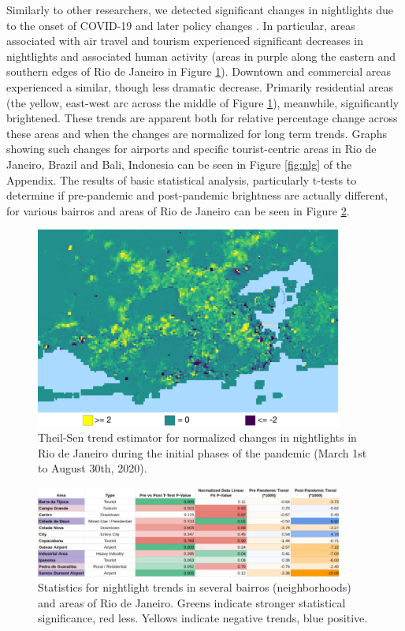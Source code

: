 Similarly to other researchers, we detected significant changes in nightlights due to the onset of COVID-19 and later policy changes \cite{elvidgeDimmingLightsChina2020, xbsdScipy2021Predicting2021}. In particular, areas associated with air travel and tourism experienced significant decreases in nightlights and associated human activity (areas in purple along the eastern and southern edges of Rio de Janeiro in Figure \ref{fig:nlts}). Downtown and commercial areas experienced a similar, though less dramatic decrease. Primarily residential areas (the yellow, east-west arc across the middle of Figure \ref{fig:nlts}), meanwhile, significantly brightened. These trends are apparent both for relative percentage change across these areas and when the changes are normalized for long term trends. Graphs showing such changes for airports and specific tourist-centric areas in Rio de Janeiro, Brazil and Bali, Indonesia can be seen in Figure \ref{fig:nlg} of the Appendix. The results of basic statistical analysis, particularly t-tests to determine if pre-pandemic and post-pandemic brightness are actually different, for various bairros and areas of Rio de Janeiro can be seen in Figure \ref{fig:nstats}.

\begin{figure}[h]
\centering
\includegraphics[width=0.9\textwidth]{Figures/chap5/Nightlights_TS.png}
\caption[Changes in nightlights in Rio de Janeiro]{Theil-Sen trend estimator for normalized changes in nightlights in Rio de Janeiro during the initial phases of the pandemic (March 1st to August 30th, 2020).}
\label{fig:nlts}
\end{figure}

\begin{figure}[H] 
\centering
\includegraphics[width=0.9\textwidth]{Figures/chap5/RioNightStats.jpg}
\caption[Nightlight Statistics for Rio de Janeiro]{Statistics for nightlight trends in several bairros (neighborhoods) and areas of Rio de Janeiro. Greens indicate stronger statistical significance, red less. Yellows indicate negative trends, blue positive.}
\label{fig:nstats}
\end{figure}


